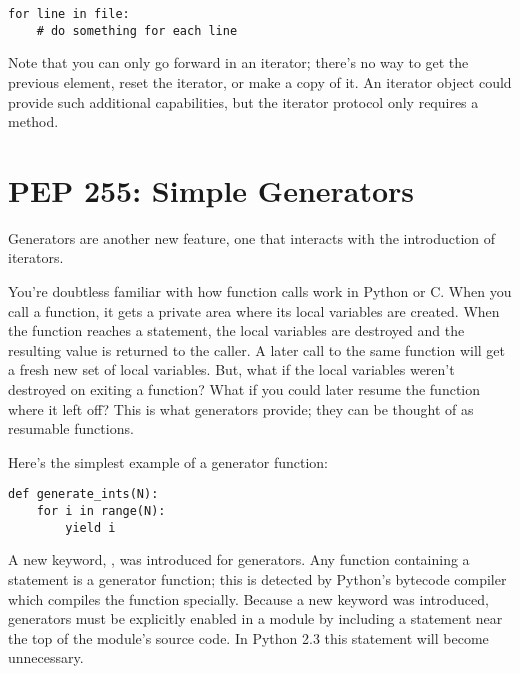 \documentclass{howto}
\begin{document}
\begin{verbatim}
for line in file:
    # do something for each line
\end{verbatim}

Note that you can only go forward in an iterator; there's no way to
get the previous element, reset the iterator, or make a copy of it.
An iterator object could provide such additional capabilities, but the
iterator protocol only requires a  method.

\begin{seealso}


\end{seealso}


\section{PEP 255: Simple Generators}

Generators are another new feature, one that interacts with the
introduction of iterators.

You're doubtless familiar with how function calls work in Python or
C.  When you call a function, it gets a private area where its local
variables are created.  When the function reaches a 
statement, the local variables are destroyed and the resulting value
is returned to the caller.  A later call to the same function will get
a fresh new set of local variables.  But, what if the local variables
weren't destroyed on exiting a function?  What if you could later
resume the function where it left off?  This is what generators
provide; they can be thought of as resumable functions.

Here's the simplest example of a generator function:

\begin{verbatim}
def generate_ints(N):
    for i in range(N):
        yield i
\end{verbatim}

A new keyword, , was introduced for generators.  Any
function containing a  statement is a generator
function; this is detected by Python's bytecode compiler which
compiles the function specially.  Because a new keyword was
introduced, generators must be explicitly enabled in a module by
including a  statement near
the top of the module's source code.  In Python 2.3 this statement
will become unnecessary.
\end{document}
